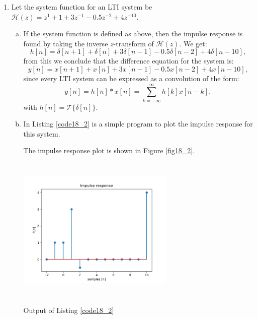 \begin{enumerate}
    \item Let the system function for an LTI system be $\mathcal{H}(z)=z^{1} + 1 + 3z^{-1} -0.5z^{-2} + 4z^{-10}$.

          \begin{enumerate}[a)]

              \item If the system function is defined as above, then the impulse response is found by taking the inverse $z$-transform of $\mathcal{H}(z)$. We get:
                    \[h[n] = \delta[n+1] + \delta[n] + 3\delta[n-1] - 0.5\delta[n-2] + 4\delta[n-10],\]
                    from this we conclude that the difference equation for the system is:
                    \[y[n] = x[n+1] + x[n] + 3x[n-1] - 0.5x[n-2] + 4x[n-10],\]
                    since every LTI system can be expressed as a convolution of the form:
                    \[y[n] = h[n]*x[n] = \sum_{k=-\infty}^{\infty}h[k]x[n-k],\]
                    with $h[n]=\mathcal{T}\{\delta[n]\}$.

              \item In Listing \ref{code18_2} is a simple program to plot the impulse response for this system.
                    

                    The impulse response plot is shown in Figure \ref{fig18_2}.
                    \begin{marginfigure}
                        \centering
                        \includegraphics[width=7.5cm, height=7.0cm]{ch18/figures/18_2.png}
                        \caption{Output of Listing \ref{code18_2}}
                        \label{fig18_2}
                    \end{marginfigure}


\end{enumerate}
\end{enumerate}
